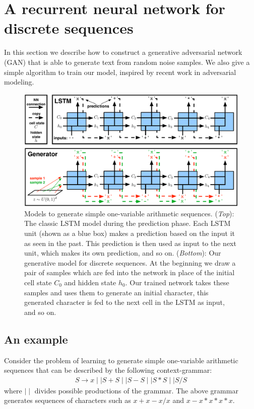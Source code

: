 \section{A recurrent neural network for discrete sequences}
In this section we describe how to construct a generative adversarial network (GAN) that is able to generate text from random noise samples. We also give a simple algorithm to train our model, inspired by recent work in adversarial modeling.

\begin{figure}[t!]
\begin{center}
\centerline{\includegraphics[width=\textwidth]{lstm_gan.pdf}}
\caption{Models to generate simple one-variable arithmetic sequences. (\emph{Top}): The classic LSTM model during the prediction phase. Each LSTM unit (shown as a blue box) makes a prediction based on the input it as seen in the past. This prediction is then used as input to the next unit, which makes its own prediction, and so on. (\emph{Bottom}): Our generative model for discrete sequences. At the beginning we draw a pair of samples which are fed into the network in place of the initial cell state $C_0$ and hidden state $h_0$. Our trained network takes these samples and uses them to generate an initial character, this generated character is fed to the next cell in the LSTM as input, and so on.}
\label{figure.prediction}
\end{center}
\end{figure}

\subsection*{An example}

Consider the problem of learning to generate simple one-variable arithmetic sequences that can be described by the following context-grammar:
\begin{align}
S \rightarrow \! x \! \mid \mid  \! S + S \! \mid \mid  \! S - S \! \mid \mid  \! S * S \! \mid \mid  \! S / S \! \nonumber
\end{align}
where $\mid\mid$ divides possible productions of the grammar. The above grammar generates sequences of characters such as $x+x-x/x$ and $x-x*x*x*x$. 

